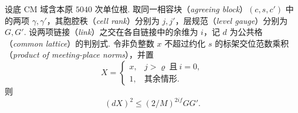 \begin{lemma}[公共格判别式的同余增益]
\label{lem:b-pair-discriminant-gain}
\emitthmsource
设底 CM 域含本原 $5040$ 次单位根. 取同一相容块（\emph{agreeing block}）$(c,s,c')$ 中的两项 $\gamma,\gamma'$，其胞腔秩（\emph{cell rank}）分别为 $j,j'$，层规范（\emph{level gauge}）分别为 $G,G'$.
设两项链接（\emph{link}）之交在各自链接中的余维为 $i$，记 $d$ 为公共格（\emph{common lattice}）的判别式.
令非负整数 $x$ 不超过约化 $s$ 的标架交位范数乘积（\emph{product of meeting-place norms}），并置
\[
 X=\begin{cases}
 x,& j>\varrho\ \text{且}\ i=0,\\
 1,&\text{其余情形}.
 \end{cases}
\]
则
\[
 (dX)^2\le (2/M)^{2if}GG'.
\]
\end{lemma}
